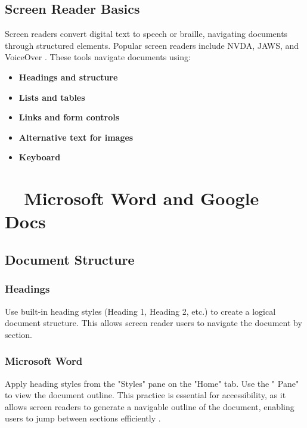 \subsection{Screen Reader Basics}\label{ch15:ssec:sr-basics}
Screen readers convert digital text to speech or braille, navigating documents through structured elements. Popular screen readers include NVDA, JAWS, and VoiceOver \supercite{NVDA2023, JAWS2023, VoiceOver2023}. These tools navigate documents using:
\begin{itemize}
	\item \textbf{Headings and structure}
	\item \textbf{Lists and tables}
	\item \textbf{Links and form controls}
	\item \textbf{Alternative text for images}
	\item \textbf{Keyboard }
\end{itemize}

\section{~~Microsoft Word and Google Docs}\label{ch15:sec:word-docs}

\subsection{Document Structure}\label{ch15:ssec:doc-structure}

\subsubsection{Headings}\label{ch15:sssec:headings}
Use built-in heading styles (Heading 1, Heading 2, etc.) to create a logical document structure. This allows screen reader users to navigate the document by section.

\subsubsection{Microsoft Word}\label{ch15:sssec:word-headings}
Apply heading styles from the "Styles" pane on the "Home" tab. Use the " Pane" to view the document outline. This practice is essential for accessibility, as it allows screen readers to generate a navigable outline of the document, enabling users to jump between sections efficiently \supercite{MicrosoftAccessibility}.

